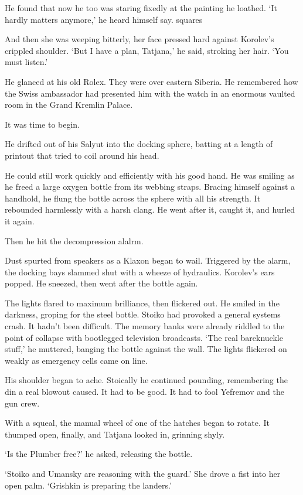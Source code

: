 He found that now he too was staring fixedly at the painting he loathed. ‘It hardly matters anymore,’ he heard himself say.
squares

And then she was weeping bitterly, her face pressed hard against Korolev’s crippled shoulder. ‘But I have a plan, Tatjana,’ he said, stroking her hair. ‘You must listen.’

He glanced at his old Rolex. They were over eastern Siberia. He remembered how the Swiss ambassador had presented him with the watch in an enormous vaulted room in the Grand Kremlin Palace.

It was time to begin.

He drifted out of his Salyut into the docking sphere, batting at a length of printout that tried to coil around his head.

He could still work quickly and efficiently with his good hand. He was smiling as he freed a large oxygen bottle from its webbing straps. Bracing himself against a handhold, he flung the bottle across the sphere with all his strength. It rebounded harmlessly with a harsh clang. He went after it, caught it, and hurled it again.

Then he hit the decompression alalrm.

Dust spurted from speakers as a Klaxon began to wail. Triggered by the alarm, the docking bays slammed shut with a wheeze of hydraulics. Korolev’s ears popped. He sneezed, then went after the bottle again.

The lights flared to maximum brilliance, then flickered out. He smiled in the darkness, groping for the steel bottle. Stoiko had provoked a general systems crash. It hadn’t been difficult. The memory banks were already riddled to the point of collapse with bootlegged television broadcasts. ‘The real bareknuckle stuff,’ he muttered, banging the bottle against the wall. The lights flickered on weakly as emergency cells came on line.

His shoulder began to ache. Stoically he continued pounding, remembering the din a real blowout caused. It had to be good. It had to fool Yefremov and the gun crew.

With a squeal, the manual wheel of one of the hatches began to rotate. It thumped open, finally, and Tatjana looked in, grinning shyly.

‘Is the Plumber free?’ he asked, releasing the bottle.

‘Stoiko and Umansky are reasoning with the guard.’ She drove a fist into her open palm. ‘Grishkin is preparing the landers.’

